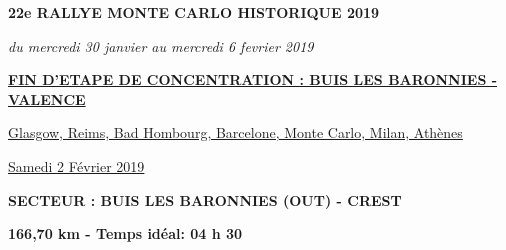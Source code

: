 \documentclass{article}%
\begin{document}
%
\normalsize%
\begin{center} \textbf{\LARGE{22e RALLYE MONTE CARLO HISTORIQUE 2019}} \end{center}%
\begin{center} \textit{du mercredi 30 janvier au mercredi 6 fevrier 2019} \end{center}%
\begin{center} \textbf{\underline{FIN D'ETAPE DE CONCENTRATION : BUIS LES BARONNIES - VALENCE}} \end{center}%
\begin{center} \underline{Glasgow, Reims, Bad Hombourg, Barcelone, Monte Carlo, Milan, Athènes} \end{center}%
\begin{flushright} \underline{Samedi 2 Février 2019
} \end{flushright}%
\begin{flushleft} \textbf{SECTEUR : BUIS LES BARONNIES (OUT) - CREST} \end{flushleft}%
\begin{flushright} \textbf{166,70 km  - Temps idéal: 04 h 30
} \end{flushright}%
\end{document}
